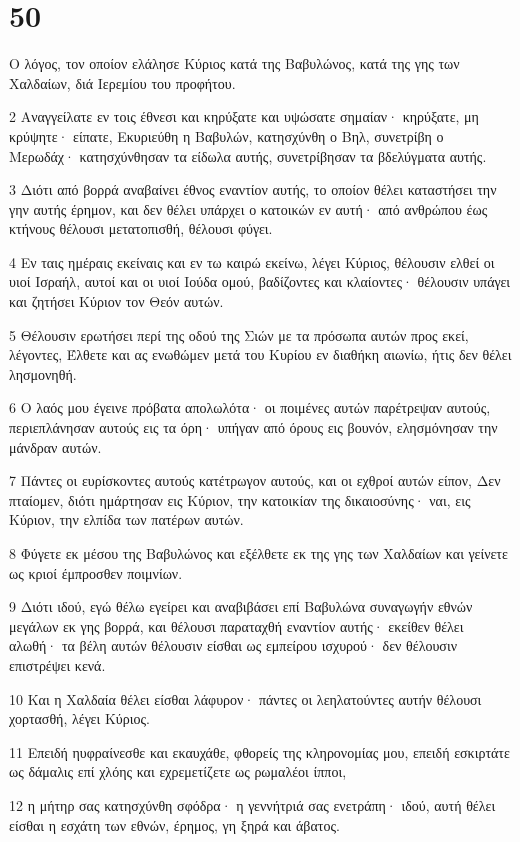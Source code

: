 \chapter{50}

\par Ο λόγος, τον οποίον ελάλησε Κύριος κατά της Βαβυλώνος, κατά της γης των Χαλδαίων, διά Ιερεμίου του προφήτου.
\par 2 Αναγγείλατε εν τοις έθνεσι και κηρύξατε και υψώσατε σημαίαν· κηρύξατε, μη κρύψητε· είπατε, Εκυριεύθη η Βαβυλών, κατησχύνθη ο Βηλ, συνετρίβη ο Μερωδάχ· κατησχύνθησαν τα είδωλα αυτής, συνετρίβησαν τα βδελύγματα αυτής.
\par 3 Διότι από βορρά αναβαίνει έθνος εναντίον αυτής, το οποίον θέλει καταστήσει την γην αυτής έρημον, και δεν θέλει υπάρχει ο κατοικών εν αυτή· από ανθρώπου έως κτήνους θέλουσι μετατοπισθή, θέλουσι φύγει.
\par 4 Εν ταις ημέραις εκείναις και εν τω καιρώ εκείνω, λέγει Κύριος, θέλουσιν ελθεί οι υιοί Ισραήλ, αυτοί και οι υιοί Ιούδα ομού, βαδίζοντες και κλαίοντες· θέλουσιν υπάγει και ζητήσει Κύριον τον Θεόν αυτών.
\par 5 Θέλουσιν ερωτήσει περί της οδού της Σιών με τα πρόσωπα αυτών προς εκεί, λέγοντες, Έλθετε και ας ενωθώμεν μετά του Κυρίου εν διαθήκη αιωνίω, ήτις δεν θέλει λησμονηθή.
\par 6 Ο λαός μου έγεινε πρόβατα απολωλότα· οι ποιμένες αυτών παρέτρεψαν αυτούς, περιεπλάνησαν αυτούς εις τα όρη· υπήγαν από όρους εις βουνόν, ελησμόνησαν την μάνδραν αυτών.
\par 7 Πάντες οι ευρίσκοντες αυτούς κατέτρωγον αυτούς, και οι εχθροί αυτών είπον, Δεν πταίομεν, διότι ημάρτησαν εις Κύριον, την κατοικίαν της δικαιοσύνης· ναι, εις Κύριον, την ελπίδα των πατέρων αυτών.
\par 8 Φύγετε εκ μέσου της Βαβυλώνος και εξέλθετε εκ της γης των Χαλδαίων και γείνετε ως κριοί έμπροσθεν ποιμνίων.
\par 9 Διότι ιδού, εγώ θέλω εγείρει και αναβιβάσει επί Βαβυλώνα συναγωγήν εθνών μεγάλων εκ γης βορρά, και θέλουσι παραταχθή εναντίον αυτής· εκείθεν θέλει αλωθή· τα βέλη αυτών θέλουσιν είσθαι ως εμπείρου ισχυρού· δεν θέλουσιν επιστρέψει κενά.
\par 10 Και η Χαλδαία θέλει είσθαι λάφυρον· πάντες οι λεηλατούντες αυτήν θέλουσι χορτασθή, λέγει Κύριος.
\par 11 Επειδή ηυφραίνεσθε και εκαυχάθε, φθορείς της κληρονομίας μου, επειδή εσκιρτάτε ως δάμαλις επί χλόης και εχρεμετίζετε ως ρωμαλέοι ίπποι,
\par 12 η μήτηρ σας κατησχύνθη σφόδρα· η γεννήτριά σας ενετράπη· ιδού, αυτή θέλει είσθαι η εσχάτη των εθνών, έρημος, γη ξηρά και άβατος.
